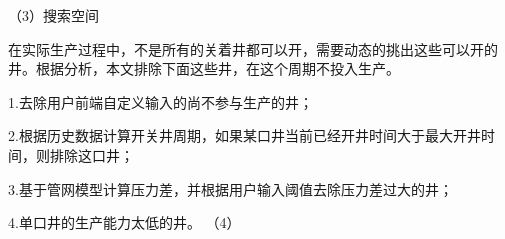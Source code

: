 （3）搜索空间

在实际生产过程中，不是所有的关着井都可以开，需要动态的挑出这些可以开的井。根据分析，本文排除下面这些井，在这个周期不投入生产。

1.去除用户前端自定义输入的尚不参与生产的井；

2.根据历史数据计算开关井周期，如果某口井当前已经开井时间大于最大开井时间，则排除这口井；

3.基于管网模型计算压力差，并根据用户输入阈值去除压力差过大的井；

4.单口井的生产能力太低的井。
（4）
